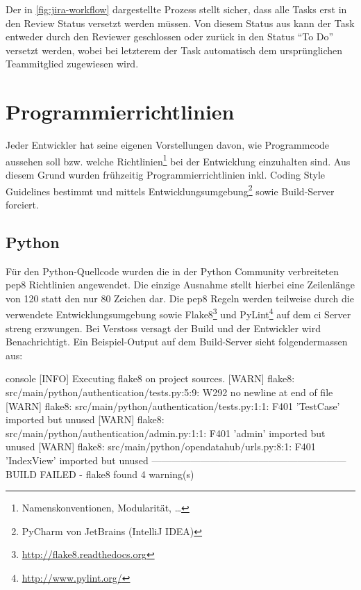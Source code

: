 Der in \cref{fig:jira-workflow} dargestellte Prozess stellt sicher, dass alle Tasks erst in den Review Status versetzt werden müssen. Von diesem Status aus kann der Task entweder durch den Reviewer geschlossen oder zurück in den Status ``To Do'' versetzt werden, wobei bei letzterem der Task automatisch dem ursprünglichen Teammitglied zugewiesen wird.

\section{Programmierrichtlinien}
Jeder Entwickler hat seine eigenen Vorstellungen davon, wie Programmcode aussehen soll bzw. welche Richtlinien\footnote{Namenskonventionen, Modularität, \dots} bei der Entwicklung einzuhalten sind. Aus diesem Grund wurden frühzeitig Programmierrichtlinien inkl. Coding Style Guidelines bestimmt und mittels Entwicklungsumgebung\footnote{PyCharm von JetBrains (IntelliJ IDEA)} sowie Build-Server forciert.

\subsection{Python}
Für den Python-Quellcode wurden die in der Python Community verbreiteten \gls{pep8} Richtlinien angewendet. Die einzige Ausnahme stellt hierbei eine Zeilenlänge von 120 statt den nur 80 Zeichen dar. Die \gls{pep8} Regeln werden teilweise durch die verwendete Entwicklungsumgebung sowie Flake8\footnote{\url{http://flake8.readthedocs.org}} und PyLint\footnote{\url{http://www.pylint.org/}} auf dem \gls{ci} Server streng erzwungen. Bei Verstoss versagt der Build und der Entwickler wird Benachrichtigt. Ein Beispiel-Output auf dem Build-Server sieht folgendermassen aus:

\begin{src}{console}
[INFO]  Executing flake8 on project sources.
[WARN]  flake8: src/main/python/authentication/tests.py:5:9: W292 no newline at end of file
[WARN]  flake8: src/main/python/authentication/tests.py:1:1: F401 'TestCase' imported but unused
[WARN]  flake8: src/main/python/authentication/admin.py:1:1: F401 'admin' imported but unused
[WARN]  flake8: src/main/python/opendatahub/urls.py:8:1: F401 'IndexView' imported but unused
------------------------------------------------------------
BUILD FAILED - flake8 found 4 warning(s)
\end{src}


